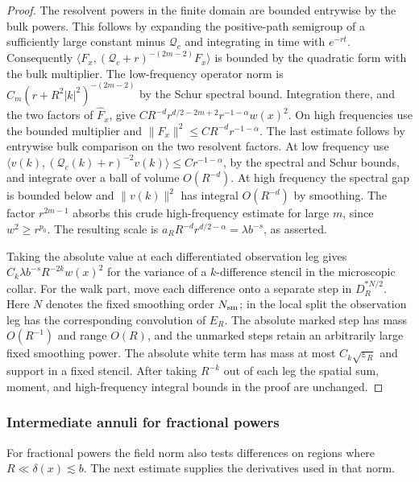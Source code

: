 \documentclass[11pt]{article}
\theoremstyle{definition}
\begin{document}
\begin{proof}
The resolvent powers in the finite domain are bounded
entrywise by the bulk powers. This follows by expanding the
positive-path semigroup of a sufficiently large constant minus
\(\mathcal Q_c\) and integrating in time with \(e^{-rt}\).
Consequently \(\langle F_x,(\mathcal Q_c+r)^{-(2m-2)}F_x\rangle\)
is bounded by the quadratic form with the bulk multiplier.
The low-frequency operator norm is
\(C_m(r+R^2|k|^2)^{-(2m-2)}\) by the Schur spectral bound.
Integration there, and the two factors of \(\widehat F_x\),
give \(C R^{-d}r^{d/2-2m+2}r^{-1-\alpha}w(x)^2\).
On high frequencies use the bounded multiplier and
\(\|F_x\|^2\le C R^{-d}r^{-1-\alpha}\).
The last estimate follows by entrywise bulk comparison on
the two resolvent factors. At low frequency use
\(\langle v(k),(\mathcal Q_c(k)+r)^{-2}v(k)\rangle
 \le Cr^{-1-\alpha}\), by the spectral and Schur bounds,
and integrate over a ball of volume \(O(R^{-d})\).
At high frequency the spectral gap is bounded below and
\(\|v(k)\|^2\) has integral \(O(R^{-d})\) by smoothing.
The factor \(r^{2m-1}\) absorbs this crude high-frequency
estimate for large \(m\), since \(w^2\ge r^{p_0}\).
The resulting scale is \(a_R R^{-d}r^{d/2-\alpha}
=\lambda b^{-s}\), as asserted.

Taking the absolute value at each differentiated observation leg gives
\(C_k\lambda b^{-s}R^{-2k}w(x)^2\) for the variance of a
\(k\)-difference stencil in the microscopic collar.
For the walk part, move each difference onto a separate step
in \(D_R^{*N/2}\). Here \(N\) denotes the fixed smoothing order \(N_{\rm sm}\); in the local
split the observation leg has the corresponding convolution of \(E_R\).
The absolute marked step has mass
\(O(R^{-1})\) and range \(O(R)\), and the unmarked steps retain
an arbitrarily large fixed smoothing power. The absolute white
term has mass at most \(C_k\sqrt{\varepsilon_R}\) and support
in a fixed stencil. After taking \(R^{-k}\) out of each leg
the spatial sum, moment, and high-frequency integral bounds
in the proof are unchanged.
\end{proof}

\subsubsection{Intermediate annuli for fractional powers}
For fractional powers the field norm also tests differences on
regions where \(R\ll\delta(x)\lesssim b\). The next estimate
supplies the derivatives used in that norm.
\end{document}
